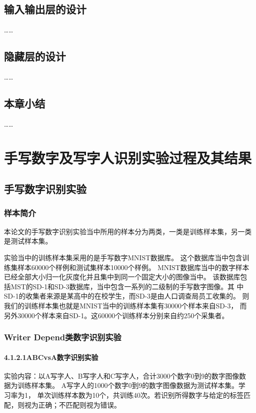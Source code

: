 \documentclass[fontset=windows,AutoFakeBold,a4paper]{article}
\begin{document}
\begin{spacing}{1.7}
    \subsection{输入输出层的设计}
    ……
    \subsection{隐藏层的设计}
    ……
    \subsection{本章小结}
    ……
    \pagebreak[4]%
    \section{手写数字及写字人识别实验过程及其结果}
    \subsection{手写数字识别实验}
    \subsubsection{样本简介}
    本论文的手写数字识别实验当中所用的样本分为两类，一类是训练样本集，另一类是测试样本集。

    实验当中的训练样本集采用的是手写数字MNIST数据库。
    这个数据库当中包含训练集样本60000个样例和测试集样本10000个样例。
    MNIST数据库当中的数字样本已经全部大小归一化灰度化并且集中到同一个固定大小的图像当中。
    该数据库包括MST的SD-1和SD-3数据库，当中包含一系列的二级制的手写数字图像。其
    中SD-1的收集者来源是某高中的在校学生，而SD-3是由人口调查局员工收集的。
    则我们的训练样本集也就是MNIST当中的训练样本集有30000个样本来自SD-3，
    而另外30000个样本来自SD-1。这60000个训练样本分别来自约250个采集者。
    \subsubsection{Writer Depend类数字识别实验}
    \paragraph{4.1.2.1\quad ABCvsA数字识别实验}

    实验内容：以A写字人、B写字人和C写字人，合计3000个数字0到9的数字图像数据为训练样本集。
    A写字人的1000个数字0到9的数字图像数据为测试样本集。学习率为1，
    单次训练样本数为10个，共训练40次。若识别所得数字与给定的标签匹配，则视为正确；不匹配则视为错误。


\end{spacing}
\end{document}
